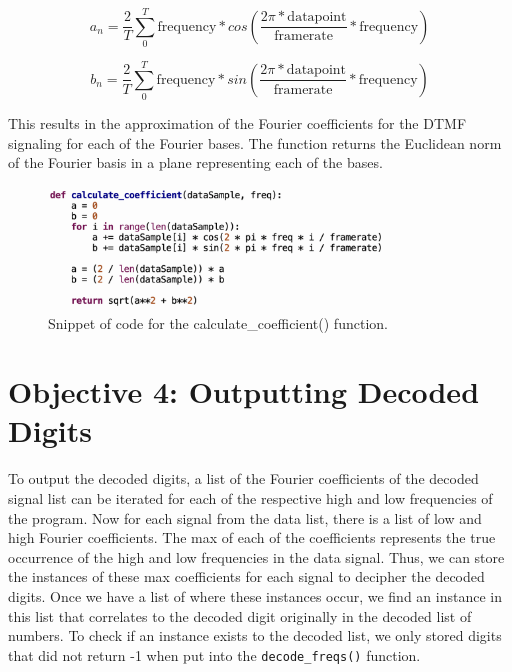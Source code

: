\documentclass[12pt]{iopart}
\begin{document}
\begin{equation}
    a_n = \frac{2}{T}\sum_{0}^{T} \mathrm{frequency} * cos(\frac{2\pi * \mathrm{data point} }{\mathrm{framerate}} * \mathrm{frequency})
\end{equation}

\begin{equation}
    b_n = \frac{2}{T}\sum_{0}^{T} \mathrm{frequency} * sin(\frac{2\pi * \mathrm{data point}}{\mathrm{framerate}} * \mathrm{frequency})
\end{equation}

This results in the approximation of the Fourier coefficients for the DTMF signaling for each of the Fourier bases. The function returns the Euclidean norm of the Fourier basis in a plane representing each of the bases.

\begin{figure}[h!tbp]
  \begin{center}
 \item[]\includegraphics[width=0.8\textwidth]{images/calculate_coefficient().png}
  \caption{\label{fig:calculate_coefficient()}
  Snippet of code for the calculate\_coefficient() function.
  }
  \end{center}
\end{figure}

\section{Objective 4: Outputting Decoded Digits}

To output the decoded digits, a list of the Fourier coefficients of the decoded signal list can be iterated for each of the respective high and low frequencies of the program. 
Now for each signal from the data list, there is a list of low and high Fourier coefficients. 
The max of each of the coefficients represents the true occurrence of the high and low frequencies in the data signal. 
Thus, we can store the instances of these max coefficients for each signal to decipher the decoded digits. 
Once we have a list of where these instances occur, we find an instance in this list that correlates to the decoded digit originally in the decoded list of numbers. 
To check if an instance exists to the decoded list, we only stored digits that did not return -1 when put into the \verb|decode_freqs()| function. 
\end{document}
